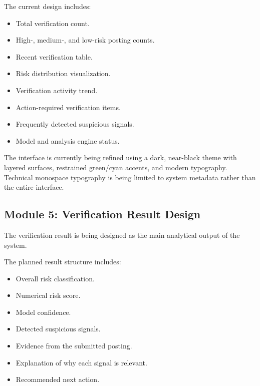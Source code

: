 \documentclass[12pt,a4paper]{report}
\begin{document}
The current design includes:

\begin{itemize}

    \item Total verification count.

    \item High-, medium-, and low-risk posting counts.

    \item Recent verification table.

    \item Risk distribution visualization.

    \item Verification activity trend.

    \item Action-required verification items.

    \item Frequently detected suspicious signals.

    \item Model and analysis engine status.

\end{itemize}

The interface is currently being refined using a dark, near-black theme with layered surfaces, restrained green/cyan accents, and modern typography. Technical monospace typography is being limited to system metadata rather than the entire interface.


\subsection{Module 5: Verification Result Design}

The verification result is being designed as the main analytical output of the system.

The planned result structure includes:

\begin{itemize}

    \item Overall risk classification.

    \item Numerical risk score.

    \item Model confidence.

    \item Detected suspicious signals.

    \item Evidence from the submitted posting.

    \item Explanation of why each signal is relevant.

    \item Recommended next action.

\end{itemize}
\end{document}
